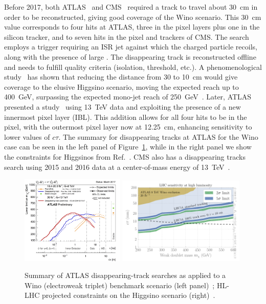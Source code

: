 {Before 2017, both ATLAS~\cite{Aad:2013yna} and CMS~\cite{CMS:2014gxa} required a track to travel about 30~cm in order to be reconstructed, giving good coverage of the Wino scenario. This 30~cm value corresponds to four hits at ATLAS, three in the pixel layers plus one in the silicon tracker, and to seven hits in the pixel and trackers of CMS. The search employs a trigger requiring an ISR jet against which the charged particle recoils, along with the presence of large \met. The disappearing track is reconstructed offline and needs to fulfill quality criteria (isolation, \pT threshold, etc.). A phenomenological study~\cite{Mahbubani:2017gjh} has shown that reducing the distance from 30 to 10~cm would give coverage to the elusive Higgsino scenario, moving the expected reach up to 400~GeV, surpassing the expected mono-jet reach of 250~GeV~\cite{Schwaller:2013baa,Low:2014cba,Barducci:2015ffa}. Later, ATLAS presented a study~\cite{ATLAS-CONF-2017-017} using 13~TeV data and exploiting the presence of a new innermost pixel layer (IBL). This addition allows for all four hits to be in the pixel, with the outermost pixel layer now at 12.25~cm, enhancing sensitivity to lower values of $c \tau$. The summary for disappearing tracks at ATLAS for the Wino case can be seen in the left panel of Figure~\ref{fig:ewkinosearches}, while in the right panel we show the constraints for Higgsinos from Ref.~\cite{Mahbubani:2017gjh}. CMS also has a disappearing tracks search using 2015 and 2016 data at a center-of-mass energy of 13~TeV~\cite{Sirunyan:2018ldc}.

\begin{figure}[t]
\centering
\includegraphics[width=0.44\textwidth]{plots/ATLAS_SUSY_LLPChargino.png}
\includegraphics[width=0.54\textwidth]{plots/Higgsino_Significance14}
\caption{Summary of ATLAS disappearing-track searches as applied to a Wino (electroweak triplet) benchmark scenario (left panel)~\cite{ATLAS:summary}; HL-LHC projected constraints on the Higgsino scenario (right)~\cite{Mahbubani:2017gjh}.}
  \label{fig:ewkinosearches}
\end{figure}

}
